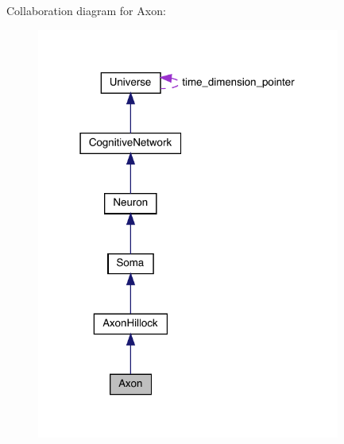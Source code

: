 Collaboration diagram for Axon\+:
\nopagebreak
\begin{figure}[H]
\begin{center}
\leavevmode
\includegraphics[width=283pt]{class_axon__coll__graph}
\end{center}
\end{figure}
